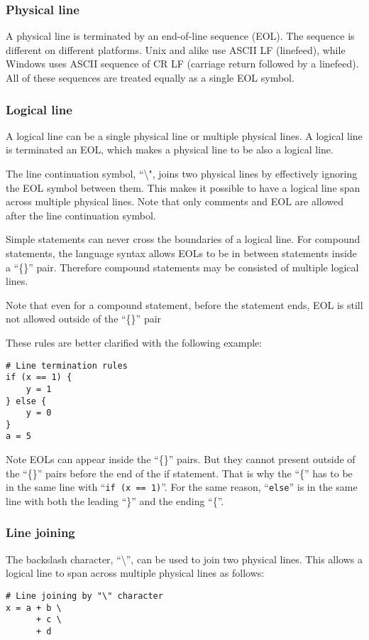 \documentclass[10pt,a4paper]{article}
\begin{document}
\subsubsection{Physical line}
A physical line is terminated by an end-of-line sequence (EOL). The
sequence is different on different platforms. Unix and alike use ASCII LF
(linefeed), while Windows uses ASCII sequence of CR LF (carriage return followed
by a linefeed). All of these sequences are treated equally as a single 
EOL symbol.

\subsubsection{Logical line}
A logical line can be a single physical line or multiple physical lines.
A logical line is terminated an EOL, which makes a physical line to be also 
a logical line.

The line continuation symbol, ``\textbackslash", joins two physical lines
by effectively ignoring the EOL symbol between them.
This makes it possible to have a logical line span across multiple 
physical lines. 
Note that only comments and EOL are allowed after the line continuation
symbol.

Simple statements can never cross the boundaries of a logical line.
For compound statements, the language syntax allows EOLs
to be in between statements inside a ``\{\}'' pair. 
Therefore compound statements may be consisted of multiple logical lines. 

Note that even for a compound statement, before the statement ends, 
EOL is still not allowed outside of the ``\{\}'' pair 

These rules are better clarified with the following example:

\begin{lstlisting}
# Line termination rules
if (x == 1) {
    y = 1
} else {
    y = 0
}
a = 5
\end{lstlisting}

Note EOLs can appear inside the ``\{\}'' pairs. 
But they cannot present outside of the ``\{\}'' pairs before the end of
the if statement. 
That is why the ``\{'' has to be in the same line with 
``\lstinline$if (x == 1)$''.
For the same reason, ``\lstinline$else$'' is in the same line with both 
the leading
``\}'' and the ending ``\{''. 

\subsubsection{Line joining}
The backslash character, ``\textbackslash'', can be used to join two 
physical lines.
This allows a logical line to span across multiple physical lines as follows:
\begin{lstlisting}
# Line joining by "\" character
x = a + b \
      + c \
      + d
\end{lstlisting}
\end{document}
